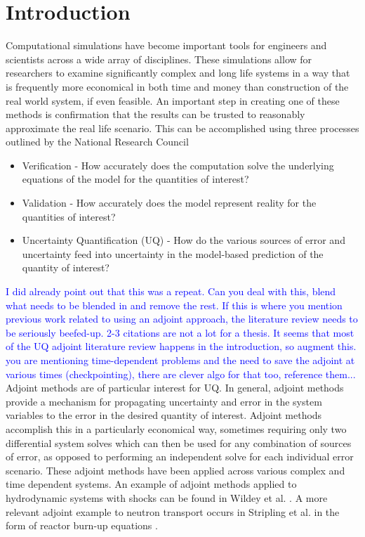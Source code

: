 \documentclass[12pt]{report}
\newcommand{\comment}[2]{\marginpar{\textcolor{#2}{$\star$}}\textcolor{#2}{#1}\newline}
\newcommand{\jcr}[1]{\comment{#1}{blue}}
\newcommand{\jcr}[1]{\phantom{a}}
\begin{document}
\section{Introduction}

Computational simulations have become important tools for engineers and scientists across a wide array of disciplines. These simulations allow for researchers to examine significantly complex and long life systems in a way that is frequently more economical in both time and money than construction of the real world system, if even feasible. An important step in creating one of these methods is confirmation that the results can be trusted to reasonably approximate the real life scenario. This can be accomplished using three processes outlined by the National Research Council \cite{NRCVVUQ}


\begin{itemize}
\item Verification - How accurately does the computation solve the underlying equations of the model for the quantities of interest?
\item Validation - How accurately does the model represent reality for the quantities of interest?
\item Uncertainty Quantification (UQ) -  How do the various sources of error and uncertainty feed into uncertainty in the model-based prediction of the quantity of interest?
\end{itemize}

\jcr{I did already point out that this was a repeat. Can you deal with this, blend what needs to be blended in and remove the rest. If this is where you mention previous work related to using an adjoint approach, the literature review needs to be seriously beefed-up. 2-3 citations are not a lot for a thesis. It seems that most of the UQ adjoint literature review happens in the introduction, so augment this. you are mentioning time-dependent problems and the need to save the adjoint at various times (checkpointing), there are clever algo for that too, reference them...}
Adjoint methods are of particular interest for UQ. In general, adjoint methods provide a mechanism for propagating uncertainty and error in the system variables to the error in the desired quantity of interest. Adjoint methods accomplish this in a particularly economical way, sometimes requiring only two differential system solves which can then be used for any combination of sources of error, as opposed to performing an independent solve for each individual error scenario. These adjoint methods have been applied across various complex and time dependent systems. An example of adjoint methods applied to hydrodynamic systems with shocks can be found in Wildey et al. \cite{Wildey}. A more relevant adjoint example to neutron transport occurs in Stripling et al. in the form of reactor burn-up equations \cite{Stripling}.
\end{document}
